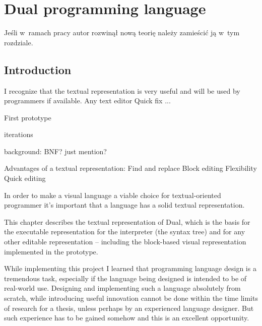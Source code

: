\chapter{Dual programming language}\label{chap:lang}

Jeśli w~ramach pracy autor rozwinął nową teorię należy zamieścić ją w~tym
rozdziale.



\section{Introduction}
I recognize that the textual representation is very useful and will be used by programmers if available.
Any text editor
Quick fix
...

First prototype

iterations

background: BNF? just mention?

Advantages of a textual representation:
Find and replace
Block editing
Flexibility
Quick editing

In order to make a visual language a viable choice for textual-oriented programmer it's important that a language has a solid textual representation.

This chapter describes the textual representation of Dual, which is the basis for the executable representation for the interpreter (the syntax tree) and for any other editable representation -- including the block-based visual representation implemented in the prototype.

While implementing this project I learned that programming language design is a tremendous task, especially if the language being designed is intended to be of real-world use. Designing and implementing such a language absolutely from scratch, while introducing useful innovation cannot be done within the time limits of research for a thesis, unless perhaps by an experienced language designer. But such experience has to be gained somehow and this is an excellent opportunity.

